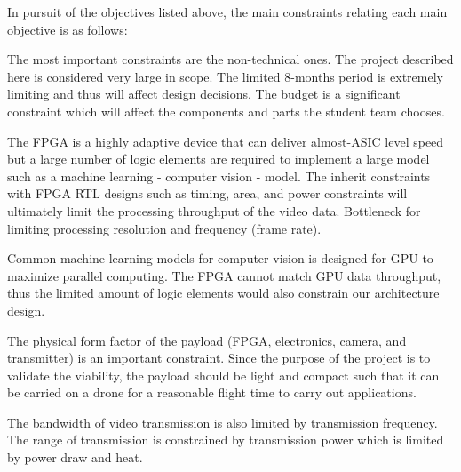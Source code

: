 In pursuit of the objectives listed above, the main constraints relating 
each main objective is as follows:

The most important constraints are the non-technical ones. The project described
here is considered very large in scope. The limited 8-months period is extremely
limiting and thus will affect design decisions. The budget is a significant
constraint which will affect the components and parts the student team chooses.

The FPGA is a highly adaptive device that can deliver almost-ASIC level speed
but a large number of logic elements are required to implement a large model 
such as a machine learning - computer vision - model. The inherit constraints
with FPGA RTL designs such as timing, area, and power constraints will ultimately
limit the processing throughput of the video data. Bottleneck for limiting
processing resolution and frequency (frame rate).

Common machine learning models for computer vision is designed for GPU to
maximize parallel computing. The FPGA cannot match GPU data throughput, thus
the limited amount of logic elements would also constrain our architecture
design.

The physical form factor of the payload (FPGA, electronics, camera, and 
transmitter) is an important constraint. Since the purpose of the project
is to validate the viability, the payload should be light and compact such
that it can be carried on a drone for a reasonable flight time to carry
out applications.

The bandwidth of video transmission is also limited by transmission frequency.
The range of transmission is constrained by transmission power which is 
limited by power draw and heat.